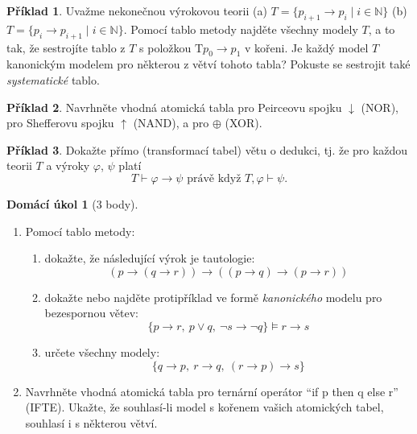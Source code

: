\documentclass[a4paper]{article}
\theoremstyle{definition}
\newtheorem{problem}{Příklad}
\newtheorem*{ukol}{Domácí úkol}
\begin{document}
\medskip\begin{problem}
    Uvažme nekonečnou výrokovou teorii (a) $T=\{p_{i+1} \to p_i\mid i\in \mathbb{N}\}$ (b) $T=\{p_i \to p_{i+1}\mid i\in \mathbb{N}\}$. Pomocí tablo metody najděte všechny modely $T$, a to tak, že sestrojíte tablo z $T$ s položkou $\mathrm{T}p_0\to p_1$ v kořeni. Je každý model $T$ kanonickým modelem pro některou z větví tohoto tabla? Pokuste se sestrojit také \emph{systematické} tablo.
\end{problem}




\medskip\begin{problem} 
    Navrhněte vhodná atomická tabla pro Peirceovu spojku $\downarrow$ (NOR), pro Shefferovu spojku $\uparrow$ (NAND), a pro $\oplus$ (XOR).
\end{problem}


\medskip\begin{problem}
Dokažte přímo (transformací tabel) větu o dedukci, tj. že pro každou teorii $T$ a výroky $\varphi$, $\psi$ platí
$$T \vdash \varphi\to \psi\text{\ \ právě když\ \ }T,\varphi \vdash \psi.$$
\end{problem}\medskip


\medskip\begin{ukol}[3 body]{\,}

\begin{enumerate}[label=\arabic*.]
\item Pomocí tablo metody:
\begin{enumerate}
    \item dokažte, že následující výrok je tautologie: 
    $$(p \to (q \to r)) \to ((p\to q)\to (p \to r))$$
    \item dokažte nebo najděte protipříklad ve formě \emph{kanonického} modelu pro bezespornou větev:
    $$\{ p \to r,\ p \vee q,\ \neg s \to \neg q\} \models r \to s$$
    \item určete všechny modely:
    $$\{ q \to p,\ r \to q,\ (r \to p) \to s\}$$
\end{enumerate}
\item Navrhněte vhodná atomická tabla pro ternární operátor ``if p then q else r'' (IFTE). Ukažte, že souhlasí-li model s kořenem vašich atomických tabel, souhlasí i s některou větví.
\end{enumerate} 
\end{ukol}
\end{document}
